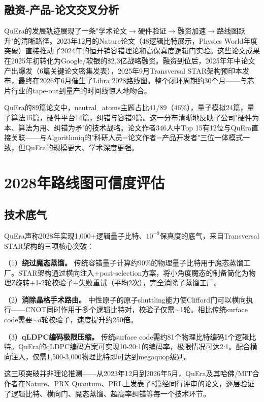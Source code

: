 \documentclass[11pt,a4paper]{ctexart}
\begin{document}
\subsection{融资-产品-论文交叉分析}
QuEra的发展轨迹展现了一条"学术论文$\rightarrow$硬件验证$\rightarrow$融资加速$\rightarrow$路线图跃升"的清晰路径。2023年12月的Nature论文（48逻辑比特展示，Physics World年度突破）直接推动了2024年的恒开销容错理论和高保真度逻辑门实验。这些论文成果在2025年初转化为Google/软银的\$2.3亿战略融资。融资到位后，2025年年中论文产出爆发（6篇关键论文密集发表），2025年9月Transversal STAR架构预印本发布，最终在2026年6月催生了Libra 2028路线图。整个闭环周期约30个月——与芯片行业的tape-out到量产的时间线惊人地吻合。

QuEra的89篇论文中，neutral\_atoms主题占比41/89（46\%），量子模拟24篇，量子算法15篇，硬件平台14篇，纠错与容错9篇。这一分布清晰地反映了公司"硬件为本、算法为用、纠错为矛"的技术战略。论文作者346人中Top 15有12位与QuEra直接关联——与Algorithmiq的"科研人员=论文作者=产品开发者"三位一体模式一致，但QuEra的规模更大、学术深度更强。

\section{2028年路线图可信度评估}

\subsection{技术底气}

QuEra声称2028年实现1,000+逻辑量子比特、$10^{-9}$保真度的底气，来自Transversal STAR架构的三项核心突破：

（1）\textbf{绕过魔态蒸馏。} 传统容错量子计算约90\%的物理量子比特用于魔态蒸馏工厂。STAR架构通过横向注入+post-selection方案，将小角度魔态的制备简化为物理Z旋转+1-2轮校验子+失败重试（平均2次），完全消除了蒸馏工厂。

（2）\textbf{消除晶格手术路由。} 中性原子的原子shuttling能力使Clifford门可以横向执行——CNOT同时作用于多个逻辑比特对，校验子仅需$\sim$1轮。相比传统surface code需要$\sim d$轮校验子，速度提升约250倍。

（3）\textbf{qLDPC编码极限压缩。} 传统surface code需约81个物理比特编码1个逻辑比特。QuEra的qLDPC编码方案可实现10-20:1的编码率，极限情况可达2:1。配合横向注入，仅需1,500-3,000物理比特即可达到megaquop级别。

这三项突破并非理论推测——从2023年12月到2026年5月，QuEra及其哈佛/MIT合作者在Nature、PRX Quantum、PRL上发表了8篇经同行评审的论文，逐层验证了逻辑比特、横向门、魔态蒸馏、超高率纠错等每一个技术环节。
\end{document}
